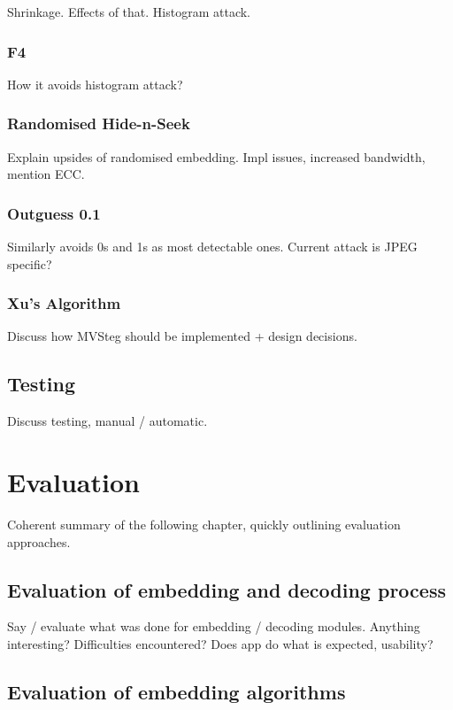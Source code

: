 \documentclass[12pt,british,twoside,notitlepage,usenames,dvipsnames,hypens,final]{report}
\numberwithin{equation}{section}
\numberwithin{figure}{section}
\begin{document}
Shrinkage. Effects of that. Histogram attack.

\subsection{F4}

How it avoids histogram attack?

\subsection{Randomised Hide-n-Seek}

Explain upsides of randomised embedding. Impl issues, increased bandwidth, mention ECC. 

\subsection{Outguess 0.1}

Similarly avoids 0s and 1s as most detectable ones. Current attack is JPEG specific?

\subsection{Xu's Algorithm}
\label{xu-alg}

Discuss how MVSteg should be implemented + design decisions.

\section{Testing}

Discuss testing, manual / automatic.

\cleardoublepage
\chapter{Evaluation}

Coherent summary of the following chapter, quickly outlining evaluation approaches.

\section{Evaluation of embedding and decoding process}

Say / evaluate what was done for embedding / decoding modules. Anything interesting? Difficulties encountered? Does app do what is expected, usability?

\section{Evaluation of embedding algorithms}
\end{document}
